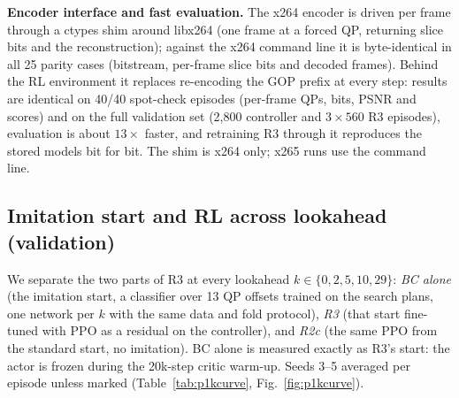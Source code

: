 
\textbf{Encoder interface and fast evaluation.} The x264 encoder is driven per frame through a ctypes shim around
libx264 (one frame at a forced QP, returning slice bits and the reconstruction); against the x264 command line it is
byte-identical in all 25 parity cases (bitstream, per-frame slice bits and decoded frames). Behind the RL environment
it replaces re-encoding the GOP prefix at every step: results are identical on 40/40 spot-check episodes (per-frame
QPs, bits, PSNR and scores) and on the full validation set (2,800 controller and $3{\times}560$ R3 episodes),
evaluation is about $13{\times}$ faster, and retraining R3 through it reproduces the stored models bit for bit. The shim
is x264 only; x265 runs use the command line.

\subsection{Imitation start and RL across lookahead (validation)}
\label{sec:p1kcurve}
We separate the two parts of R3 at every lookahead $k\in\{0,2,5,10,29\}$: \emph{BC alone} (the imitation start, a
classifier over 13 QP offsets trained on the search plans, one network per $k$ with the same data and fold protocol),
\emph{R3} (that start fine-tuned with PPO as a residual on the controller), and \emph{R2c} (the same PPO from the
standard start, no imitation). BC alone is measured exactly as R3's start: the actor is frozen during the 20k-step
critic warm-up. Seeds 3--5 averaged per episode unless marked (Table~\ref{tab:p1kcurve}, Fig.~\ref{fig:p1kcurve}).

